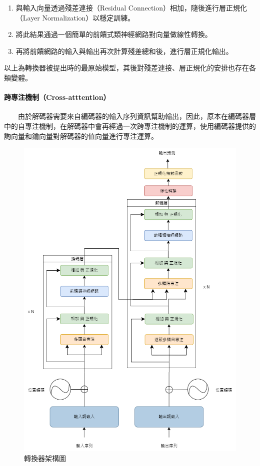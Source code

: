 \begin{enumerate}
    \item 與輸入向量透過殘差連接（Residual Connection）相加，隨後進行層正規化（Layer Normalization）以穩定訓練。
    \item 將此結果通過一個簡單的前饋式類神經網路對向量做線性轉換。
    \item 再將前饋網路的輸入與輸出再次計算殘差總和後，進行層正規化輸出。
\end{enumerate}

        以上為轉換器被提出時的最原始模型，其後對殘差連接、層正規化的安排也存在各類變體。

\paragraph{跨專注機制（Cross-atttention）} \hfill \break
%
　　由於解碼器需要來自編碼器的輸入序列資訊幫助輸出，因此，原本在編碼器層中的自專注機制，在解碼器中會再經過一次跨專注機制的運算，使用編碼器提供的詢向量和鑰向量對解碼器的值向量進行專注運算。

\begin{figure}
    \centering
    \includegraphics[width=0.9\linewidth]{figures/tfm_arch.drawio.png}
    \caption{轉換器架構圖}
    \label{fig:tfm_arch}
\end{figure}

